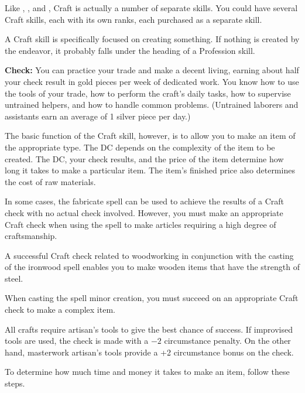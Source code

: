 Like , , and , Craft is actually a number of separate skills. You could have several Craft skills, each with its own ranks, each purchased as a separate skill.

A Craft skill is specifically focused on creating something. If nothing is created by the endeavor, it probably falls under the heading of a Profession skill.

\textbf{Check:} You can practice your trade and make a decent living, earning about half your check result in gold pieces per week of dedicated work. You know how to use the tools of your trade, how to perform the craft's daily tasks, how to supervise untrained helpers, and how to handle common problems. (Untrained laborers and assistants earn an average of 1 silver piece per day.)

The basic function of the Craft skill, however, is to allow you to make an item of the appropriate type. The DC depends on the complexity of the item to be created. The DC, your check results, and the price of the item determine how long it takes to make a particular item. The item's finished price also determines the cost of raw materials.

In some cases, the fabricate spell can be used to achieve the results of a Craft check with no actual check involved. However, you must make an appropriate Craft check when using the spell to make articles requiring a high degree of craftsmanship.

A successful Craft check related to woodworking in conjunction with the casting of the ironwood spell enables you to make wooden items that have the strength of steel.

When casting the spell minor creation, you must succeed on an appropriate Craft check to make a complex item.

All crafts require artisan's tools to give the best chance of success. If improvised tools are used, the check is made with a $-2$ circumstance penalty. On the other hand, masterwork artisan's tools provide a +2 circumstance bonus on the check.

To determine how much time and money it takes to make an item, follow these steps.

